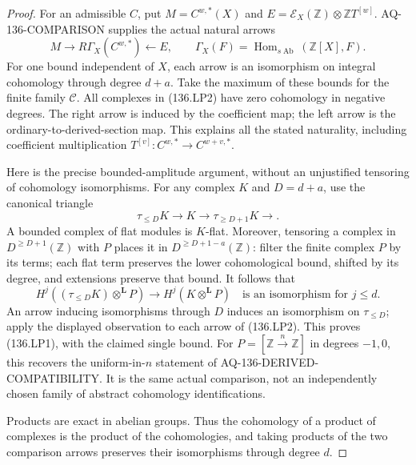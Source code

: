 \begin{proof}
For an admissible $C$, put $M=C^{w,*}(X)$ and
$E=\mathcal E_X(\mathbb Z)\otimes\mathbb ZT^{[w]}$.
AQ-136-COMPARISON supplies the actual natural arrows
\[
 M\longrightarrow
 R\Gamma_X(C^{w,*})\longleftarrow E,
 \qquad
 \Gamma_X(F)=\operatorname{Hom}_{s\operatorname{Ab}}
                       (\mathbb Z[X],F).                 \tag{136.LP2}
\]
For one bound independent of $X$, each arrow is an isomorphism
on integral cohomology through degree $d+a$. Take the maximum
of these bounds for the finite family $\mathscr C$.
All complexes in (136.LP2) have zero cohomology in negative
degrees. The right arrow is induced by the coefficient map;
the left arrow is the ordinary-to-derived-section map. This
explains all the stated naturality, including coefficient
multiplication $T^{[v]}:C^{w,*}\to C^{w+v,*}$.

Here is the precise bounded-amplitude argument, without an
unjustified tensoring of cohomology isomorphisms. For any complex
$K$ and $D=d+a$, use the canonical triangle
\[
 \tau_{\leq D}K\longrightarrow K\longrightarrow
                          \tau_{\geq D+1}K\longrightarrow.
\]
A bounded complex of flat modules is $K$-flat. Moreover,
tensoring a complex in $D^{\geq D+1}(\mathbb Z)$ with $P$
places it in $D^{\geq D+1-a}(\mathbb Z)$: filter the finite
complex $P$ by its terms; each flat term preserves the lower
cohomological bound, shifted by its degree, and extensions
preserve that bound. It follows that
\[
 H^j((\tau_{\leq D}K)\otimes^{\mathbf L}P)
       \longrightarrow H^j(K\otimes^{\mathbf L}P)
             \quad\text{is an isomorphism for }j\leq d.
\]
An arrow inducing isomorphisms through $D$ induces an
isomorphism on $\tau_{\leq D}$; apply the displayed observation
to each arrow of (136.LP2). This proves (136.LP1), with the
claimed single bound. For $P=[\mathbb Z\xrightarrow{n}\mathbb Z]$
in degrees $-1,0$, this recovers the uniform-in-$n$ statement
of AQ-136-DERIVED-COMPATIBILITY. It is the same actual
comparison, not an independently chosen family of abstract
cohomology identifications.

Products are exact in abelian groups. Thus the cohomology of
a product of complexes is the product of the cohomologies,
and taking products of the two comparison arrows preserves
their isomorphisms through degree $d$.


\end{proof}
